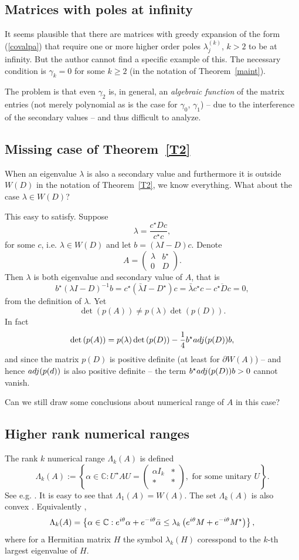 \documentclass[10pt,a4paper,reqno]{amsart}
\newcommand{\nadsebou}[2]{\begin{array}{c} #1 \\ #2 \end{array}}
\newcommand{\zav}[1]{\left( #1 \right)}
\newcommand{\szav}[1]{\left\{ #1 \right\}}
\newcommand{\imag}{{\rm i}}
\newcommand{\deter}[1]{\det\zav{#1}}
\begin{document}
\subsection*{Matrices with poles at infinity}
It seems plausible that there are matrices with greedy expansion of the form (\ref{covalpa}) that require one or more higher order poles $\lambda_j^{(k)}$, $k>2$ to be at infinity. But the author cannot find a specific example of this. The necessary condition is $\gamma_k=0$ for some $k\geq 2$ (in the notation of Theorem~\ref{maint}). 

The problem is that even $\gamma_2$ is, in general, an \textit{algebraic function } of the matrix entries (not merely polynomial as is the case for $\gamma_0$, $\gamma_1$) -- due to the interference of the secondary values -- and thus difficult to analyze.
 
\subsection*{Missing case of Theorem~\ref{T2}}
When an eigenvalue $\lambda$ is also a secondary value and furthermore it is outside $W(D)$ in the notation of Theorem~\ref{T2}, we know everything. What about the case $\lambda\in W(D)$? 

This easy to satisfy. Suppose
$$
\lambda=\frac{c^\star D c}{c^\star c},
$$
for some $c$, i.e. $\lambda\in W(D)$ and let $b=(\lambda I-D)c$. Denote
$$
A=\zav{\nadsebou{\lambda }{0}\nadsebou{b^\star}{D}}.
$$
Then $\lambda$ is both eigenvalue and secondary value of $A$, that is
$$
b^\star (\lambda I-D)^{-1}b=c^\star (\bar \lambda I-D^\star )c=\bar \lambda c^\star c-\overline{c^\star D c}=0,
$$
from the definition of $\lambda$. Yet
$$
\deter{p(A)}\not=p(\lambda)\deter{p(D)}.
$$
In fact
$$
\deter{p(A)}=p(\lambda)\deter{p(D)}-\frac14 b^\star{\rm adj}(p(D))b,
$$
and since the matrix $p(D)$ is positive definite (at least for $\partial W(A)$) -- and hence ${\rm adj}(p(d))$ is also positive definite -- the term $b^\star{\rm adj}(p(D))b>0$ cannot vanish.

Can we still draw some conclusions about numerical range of $A$ in this case?

\subsection*{Higher rank numerical ranges} The rank $k$ numerical range $\Lambda_k(A)$ is defined
$$
\Lambda_k(A):=\szav{\alpha\in\mathbb{C}: U^\star A U=\zav{\nadsebou{\alpha I_k}{*}\nadsebou{*}{*}}, \text{ for some unitary }U}.
$$
See e.g. \cite{rankkpaper1,rankkpaper2,rankkpaper3}. 
It is easy to see that $\Lambda_1(A)=W(A)$. The set $\Lambda_k(A)$ is also convex \cite{rankkpaper4}.
Equivalently \cite{rankkpaper5},
$$
\Lambda_k(A)=\szav{\alpha\in\mathbb{C}: e^{\imag \theta}\alpha+ e^{-\imag \theta}\bar \alpha\leq \lambda_k\zav{e^{\imag \theta} M+e^{-\imag \theta} M^\star}},
$$ 
where for a Hermitian matrix $H$ the symbol $\lambda_k(H)$ coresspond to the $k$-th largest eigenvalue of $H$.
\end{document}
